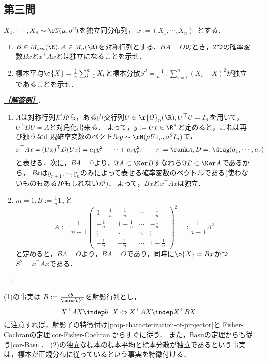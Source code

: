 \documentclass[uplatex,dvipdfmx]{jsarticle}
\begin{document}
\subsection{第三問}

\begin{tcolorbox}[colframe=ForestGreen, colback=ForestGreen!10!white,breakable,colbacktitle=ForestGreen!40!white,coltitle=black,fonttitle=\bfseries\sffamily,
    title=第３問]
    \begin{problem}\label{prob-21-8-3-sample-mean-and-variance}
        $X_1,\cdots,X_n\sim\rN(\mu,\sigma^2)$を独立同分布列，
    $x:=(X_1,\cdots,X_n)^\top$とする．
    \begin{enumerate}
        \item $B\in M_{mn}(\R),A\in M_n(\R)$を対称行列とする．$BA=O$のとき，2つの確率変数$Bx$と$x^\top Ax$とは独立になることを示せ．
        \item 標本平均$\o{X}=\frac{1}{n}\sum_{i=1}^nX_i$と標本分散$S^2=\frac{1}{n-1}\sum_{i=1}^n(X_i-X)^2$が独立であることを示せ．
    \end{enumerate}
    \end{problem}
\end{tcolorbox}
\begin{proof}[\textbf{\underline{［解答例］}}]\mbox{}
    \begin{enumerate}
        \item $A$は対称行列だから，ある直交行列$U\in \r{O}_n(\R),U^\top U=I_n$を用いて，$U^\top DU=A$と対角化出来る．
        よって，$y:=Ux\in\R^n$と定めると，これは再び独立な正規確率変数のベクトル$y\sim\rN(\mu U1_n,\sigma^2I_n)$で，
        \[x^\top Ax=(Ux)^\top D(Ux)=a_1y_1^2+\cdots+a_ry_r^2,\qquad r:=\rank A,D=:\diag(a_1,\cdots,a_r)\]
        と表せる．次に，$BA=0$より，$\Im A\subset\Ker B$すなわち$\Im B\subset\Ker A$であるから，
        $Bx$は$y_{r+1},\cdots,y_{n}$のみによって表せる確率変数のベクトルである(使わないものもあるかもしれないが)．
        よって，$Bx$と$x^\top Ax$は独立．
        \item $m=1,B:=\frac{1}{n}1_n^\top$と
        \[A:=\frac{1}{n-1}\begin{pmatrix}1-\frac{1}{n}&-\frac{1}{n}&\cdots&-\frac{1}{n}\\-\frac{1}{n}&1-\frac{1}{n}&\cdots&-\frac{1}{n}\\\vdots&\ddots&\ddots&\vdots\\-\frac{1}{n}&-\frac{1}{n}&\cdots&1-\frac{1}{n}\end{pmatrix}^2=:\frac{1}{n-1}\Lambda^2\]
        と定めると，$B\Lambda=O$より，$BA=O$であり，同時に$\o{X}=Bx$かつ$S^2=x^\top Ax$である．
    \end{enumerate}
\end{proof}
\begin{remarks*}
    (1)の事実は
    $B:=\frac{bb^\top}{\norm{b}^2}$を射影行列とし，
    \[X^\top AX\indep b^\top X\Leftrightarrow X^\top AX\indep X^\top BX\]
    に注意すれば，射影子の特徴付け\ref{prop-characterization-of-projector}と
    Fisher-Cochranの定理\ref{cor-Fisher-Cochran}からすぐに従う．
    また，Basuの定理からも従う\ref{cor-Basu}．
    (2)の独立な標本の標本平均と標本分散が独立であるという事実は，標本が正規分布に従っているという事実を特徴付ける\cite{Kawata-Sakamoto49}．
\end{remarks*}
\end{document}
